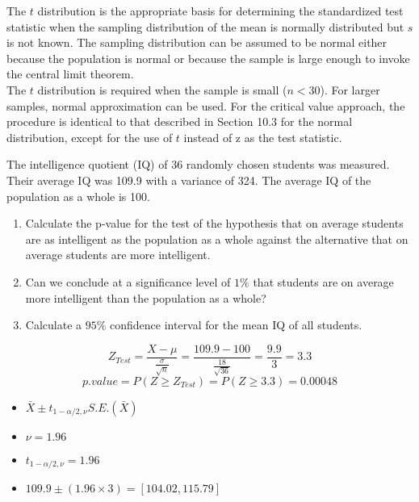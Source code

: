 ﻿\documentclass[a4]{beamer}
\begin{document}
\begin{frame}


The $t$ distribution is the appropriate basis for
determining the standardized test statistic when the sampling
distribution of the mean is normally distributed but $s$ is not
known. The sampling distribution can be assumed to be normal
either because the population is normal or because the sample is
large enough to invoke the central limit theorem. \\ The $t$
distribution is required when the sample is small ($n < 30$). For
larger samples, normal approximation can be used. For the critical
value approach, the procedure is identical to that described in
Section 10.3 for the normal distribution, except for the use of $t$
instead of z as the test statistic.
\end{frame}
\begin{frame}
The intelligence quotient (IQ) of 36 randomly chosen students was measured.
Their average IQ was 109.9 with a variance of 324.
The average IQ of the population as a whole is 100.
\begin{enumerate}
\item Calculate the p-value for the test of the hypothesis that on average
students are as intelligent as the population as a whole against the alternative that on average students are more intelligent.
\item Can we conclude at a significance level of $1\%$ that students are on average more intelligent than the population as a whole?
\item Calculate a $95\%$ confidence interval for the mean IQ of all students.
\end{enumerate}
\[Z_{Test} = \frac{X- \mu}{\frac{\sigma}{\sqrt{n}}} = \frac{109.9 - 100}{\frac{18}{\sqrt{36}}} = \frac{9.9}{3} = 3.3\]
\[p.value = P(Z \geq Z_{Test}) = P(Z \geq 3.3) = 0.00048\]
\end{frame}
\begin{frame}
\begin{itemize}
\item $\bar{X} \pm t_{1-\alpha/2,\nu}S.E.(\bar{X})$
\item $\nu = 1.96$
\item $t_{1-\alpha/2,\nu} = 1.96$
\item $109.9 \pm (1.96 \times 3) = [104.02, 115.79]$
\end{itemize}
\end{frame}
\end{document}
